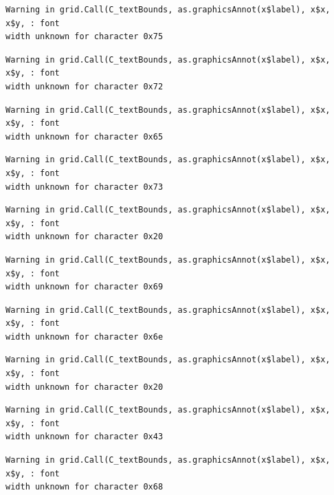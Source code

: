 \documentclass[
  letterpaper,
  DIV=11,
  numbers=noendperiod]{scrreprt}
\begin{document}
\begin{verbatim}
Warning in grid.Call(C_textBounds, as.graphicsAnnot(x$label), x$x, x$y, : font
width unknown for character 0x75
\end{verbatim}

\begin{verbatim}
Warning in grid.Call(C_textBounds, as.graphicsAnnot(x$label), x$x, x$y, : font
width unknown for character 0x72
\end{verbatim}

\begin{verbatim}
Warning in grid.Call(C_textBounds, as.graphicsAnnot(x$label), x$x, x$y, : font
width unknown for character 0x65
\end{verbatim}

\begin{verbatim}
Warning in grid.Call(C_textBounds, as.graphicsAnnot(x$label), x$x, x$y, : font
width unknown for character 0x73
\end{verbatim}

\begin{verbatim}
Warning in grid.Call(C_textBounds, as.graphicsAnnot(x$label), x$x, x$y, : font
width unknown for character 0x20
\end{verbatim}

\begin{verbatim}
Warning in grid.Call(C_textBounds, as.graphicsAnnot(x$label), x$x, x$y, : font
width unknown for character 0x69
\end{verbatim}

\begin{verbatim}
Warning in grid.Call(C_textBounds, as.graphicsAnnot(x$label), x$x, x$y, : font
width unknown for character 0x6e
\end{verbatim}

\begin{verbatim}
Warning in grid.Call(C_textBounds, as.graphicsAnnot(x$label), x$x, x$y, : font
width unknown for character 0x20
\end{verbatim}

\begin{verbatim}
Warning in grid.Call(C_textBounds, as.graphicsAnnot(x$label), x$x, x$y, : font
width unknown for character 0x43
\end{verbatim}

\begin{verbatim}
Warning in grid.Call(C_textBounds, as.graphicsAnnot(x$label), x$x, x$y, : font
width unknown for character 0x68
\end{verbatim}
\end{document}
